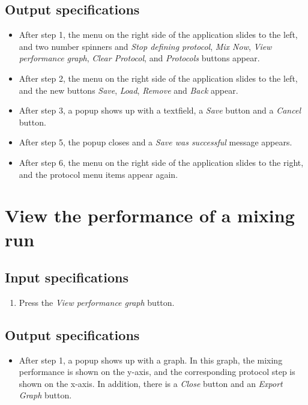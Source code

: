 \subsection*{Output specifications}
\begin{itemize}
\item After step 1, the menu on the right side of the application slides to the left, and two number spinners and \emph{Stop defining protocol}, \emph{Mix Now}, \emph{View performance graph}, \emph{Clear Protocol}, and \emph{Protocols} buttons appear.
\item After step 2, the menu on the right side of the application slides to the left, and the new buttons \emph{Save}, \emph{Load}, \emph{Remove} and \emph{Back} appear.
\item After step 3, a popup shows up with a textfield, a \emph{Save} button and a \emph{Cancel} button.
\item After step 5, the popup closes and a \emph{Save was successful} message appears.
\item After step 6, the menu on the right side of the application slides to the right, and the protocol menu items appear again.
\end{itemize}

\section{View the performance of a mixing run}

\subsection*{Input specifications}
\begin{enumerate}
\item Press the \emph{View performance graph} button.
\end{enumerate}

\subsection*{Output specifications}
\begin{itemize}
\item After step 1, a popup shows up with a graph. In this graph, the mixing performance is shown on the y-axis, and the corresponding protocol step is shown on the x-axis. In addition, there is a \emph{Close} button and an \emph{Export Graph} button.
\end{itemize}

